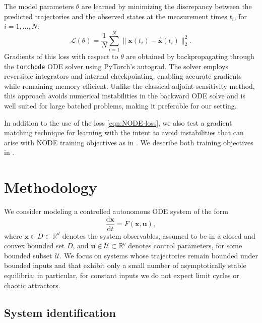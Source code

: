 \documentclass[11pt,twoside]{article}
\theoremstyle{plain}
\theoremstyle{definition}
\theoremstyle{remark}
\newcommand{\vect}[1]{\boldsymbol{#1}}
\begin{document}
The model parameters \(\theta\) are learned by minimizing the discrepancy between the predicted trajectories and the observed states at the measurement times \(t_i\), for \(i =1, \ldots, N\):
\begin{equation}
    \mathcal{L}(\theta) = \frac{1}{N}\sum_{i=1}^{N} \big\| \vect{x}(t_i) - \widehat{\vect{x}}(t_i) \big\|_2^2.
    \label{eqn:NODE-loss}
\end{equation}
Gradients of this loss with respect to \(\theta\) are obtained by backpropagating through the \texttt{torchode} ODE solver using PyTorch's autograd. The solver employs reversible integrators and internal checkpointing, enabling accurate gradients while remaining memory efficient. Unlike the classical adjoint sensitivity method, this approach avoids numerical instabilities in the backward ODE solve and is well suited for large batched problems, making it preferable for our setting.


In addition to the use of the loss \cref{eqn:NODE-loss}, we also test a gradient matching technique for learning with the intent to avoid instabilities that can arise with NODE training objectives as in \cite{okamoto2025learningsimplestneuralode}. We describe both training objectives in .


\section{Methodology}

We consider modeling a controlled autonomous ODE system of the form
\begin{equation}
    \frac{\mathrm{d}\vect{x}}{\mathrm{d}t} = F(\vect{x}, \vect{u}),
\end{equation}
where \(\vect{x} \in D \subset \mathbb{R}^d\) denotes the system observables, assumed to be in a closed and convex bounded set \(D\), and \(\vect{u} \in \mathcal{U} \subset \mathbb{R}^q\) denotes control parameters, for some bounded subset \(\mathcal{U}\). We focus on systems whose trajectories remain bounded under bounded inputs and that exhibit only a small number of asymptotically stable equilibria; in particular, for constant inputs we do not expect limit cycles or chaotic attractors.

\subsection{System identification} 
\end{document}
